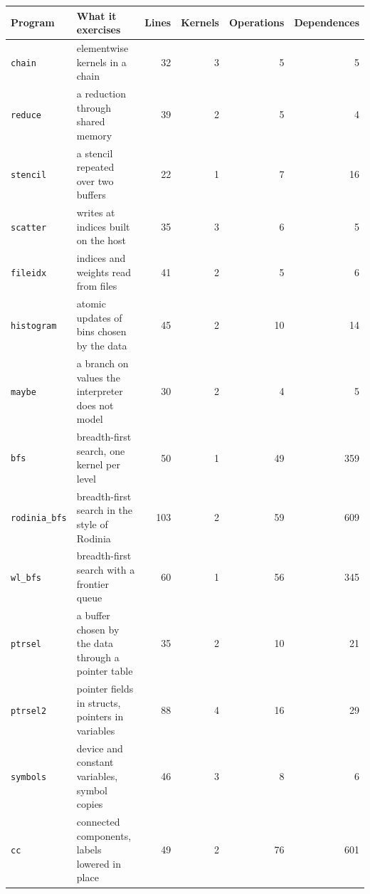 \begin{tabular}{llrrrr}
\toprule
Program & What it exercises & Lines & Kernels & Operations & Dependences \\
\midrule
\texttt{chain} & elementwise kernels in a chain & 32 & 3 & 5 & 5 \\
\texttt{reduce} & a reduction through shared memory & 39 & 2 & 5 & 4 \\
\texttt{stencil} & a stencil repeated over two buffers & 22 & 1 & 7 & 16 \\
\texttt{scatter} & writes at indices built on the host & 35 & 3 & 6 & 5 \\
\texttt{fileidx} & indices and weights read from files & 41 & 2 & 5 & 6 \\
\texttt{histogram} & atomic updates of bins chosen by the data & 45 & 2 & 10 & 14 \\
\texttt{maybe} & a branch on values the interpreter does not model & 30 & 2 & 4 & 5 \\
\texttt{bfs} & breadth-first search, one kernel per level & 50 & 1 & 49 & 359 \\
\texttt{rodinia\_bfs} & breadth-first search in the style of Rodinia & 103 & 2 & 59 & 609 \\
\texttt{wl\_bfs} & breadth-first search with a frontier queue & 60 & 1 & 56 & 345 \\
\texttt{ptrsel} & a buffer chosen by the data through a pointer table & 35 & 2 & 10 & 21 \\
\texttt{ptrsel2} & pointer fields in structs, pointers in variables & 88 & 4 & 16 & 29 \\
\texttt{symbols} & device and constant variables, symbol copies & 46 & 3 & 8 & 6 \\
\texttt{cc} & connected components, labels lowered in place & 49 & 2 & 76 & 601 \\
\bottomrule
\end{tabular}
